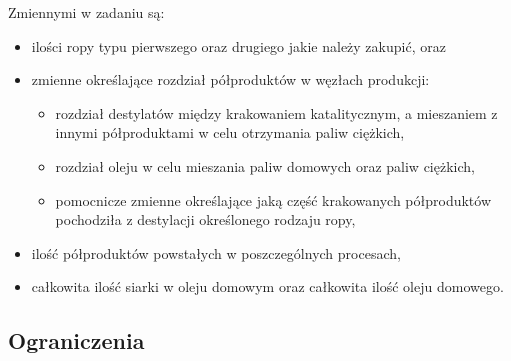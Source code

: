 \documentclass[polish,12pt,titlepage]{article}
\begin{document}
Zmiennymi w zadaniu są:
\begin{itemize}
    \item ilości ropy typu pierwszego oraz drugiego jakie należy zakupić, oraz 
    \item zmienne określające rozdział półproduktów w węzłach produkcji:
    \begin{itemize}
        \item rozdział destylatów między krakowaniem katalitycznym, a mieszaniem z innymi półproduktami w celu otrzymania paliw ciężkich,
        \item rozdział oleju w celu mieszania paliw domowych oraz paliw ciężkich,
        \item pomocnicze zmienne określające jaką część krakowanych półproduktów pochodziła z destylacji określonego rodzaju ropy,
    \end{itemize}
    \item ilość półproduktów powstałych w poszczególnych procesach,
    \item całkowita ilość siarki w oleju domowym oraz całkowita ilość oleju domowego.
\end{itemize}

\subsection{Ograniczenia}
\end{document}
